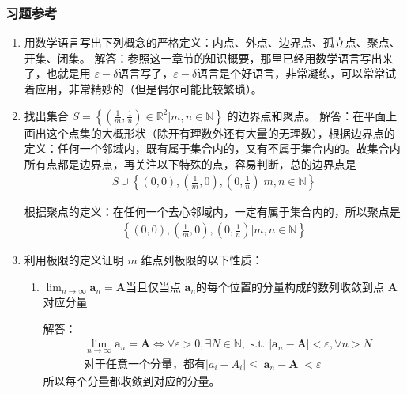 \subsubsection{习题参考}
\begin{enumerate}
\item 用数学语言写出下列概念的严格定义：内点、外点、边界点、孤立点、聚点、开集、闭集。
解答：参照这一章节的知识概要，那里已经用数学语言写出来了，也就是用 $\varepsilon - \delta$语言写了，$\varepsilon - \delta$语言是个好语言，非常凝练，可以常常试着应用，非常精妙的（但是偶尔可能比较繁琐）。

\item 找出集合 $S=\left\{\left(\frac1m,\frac1n\right)\in\mathbb{R}^2|m,n\in\mathbb{N}\right\}$ 的边界点和聚点。
解答：在平面上画出这个点集的大概形状（除开有理数外还有大量的无理数），根据边界点的定义：任何一个邻域内，既有属于集合内的，又有不属于集合内的。故集合内所有点都是边界点，再关注以下特殊的点，容易判断，总的边界点是
\begin{align*}
    S \cup \left\{ (0,0), \left(\frac{1}{m},0 \right),\left(0, \frac{1}{n}\right) |m,n\in\mathbb{N} \right\}
\end{align*}

根据聚点的定义：在任何一个去心邻域内，一定有属于集合内的，所以聚点是
\begin{align*}
    \left\{ (0,0), \left(\frac{1}{m},0 \right),\left(0, \frac{1}{n}\right) |m,n\in\mathbb{N} \right\}
\end{align*}

\item 利用极限的定义证明 $m$ 维点列极限的以下性质：
    \begin{enumerate}[(1)]
    
    \item $\lim _{n\to \infty} \mathbf{a}_n = \mathbf{A}$当且仅当点 $\mathbf{a}_n$的每个位置的分量构成的数列收敛到点 $\mathbf{A}$ 对应分量

    解答：
    \begin{align*}
        & \lim _{n\to \infty} \mathbf{a}_n = \mathbf{A} \Leftrightarrow \forall \varepsilon>0,\exists N \in \mathbb{N},\text{ s.t. }|\mathbf{a}_n - \mathbf{A}|< \varepsilon, \forall n > N \\
        & \text{对于任意一个分量，都有}  |a_i - A_i| \le |\mathbf{a}_n - \mathbf{A}| < \varepsilon 
    \end{align*}
    所以每个分量都收敛到对应的分量。
    

\end{enumerate}
\end{enumerate}
